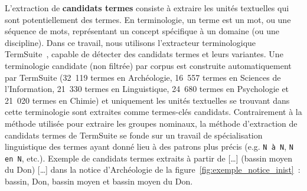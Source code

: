     L'extraction de \textbf{candidats termes} consiste à extraire les unités
    textuelles qui sont potentiellement des termes. En terminologie, un terme
    est un mot, ou une séquence de mots, représentant un concept spécifique à un
    domaine (ou une discipline). Dans ce travail, nous utilisons l'extracteur
    terminologique TermSuite~\cite{rocheteau2011termsuite}, capable de détecter
    des candidats termes et leurs variantes. Une terminologie candidate (non
    filtrée) par corpus est construite automatiquement par TermSuite (32~119
    termes en Archéologie, 16~557 termes en Sciences de l'Information, 21~330
    termes en Linguistique, 24~680 termes en Psychologie et 21~020 termes en
    Chimie) et uniquement les unités textuelles se trouvant dans cette
    terminologie sont extraites comme termes-clés candidats. Contrairement à la
    méthode utilisée pour extraire les groupes nominaux, la méthode d'extraction
    de candidats termes de TermSuite se fonde sur un travail de spécialisation
    linguistique des termes ayant donné lieu à des patrons plus précis (e.g.
    \texttt{N à N}, \texttt{N en N}, etc.). Exemple de candidats termes extraits
    à partir de \og{}[\dots] (bassin moyen du Don) [\dots]\fg{} dans la notice
    d'Archéologie de la figure~\ref{fig:exemple_notice_inist}~:
    \og{}bassin\fg{}, \og{}Don\fg{}, \og{}bassin moyen\fg{} et \og{}bassin moyen
    du Don\fg{}.
    

